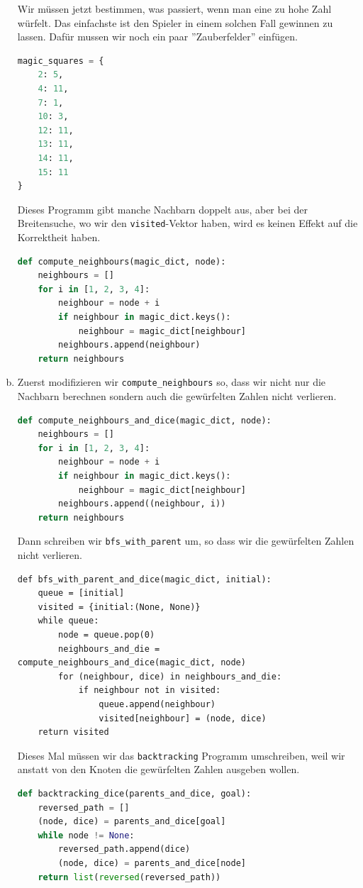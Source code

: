 \begin{enumerate}[(a)]
    Wir müssen jetzt bestimmen, was passiert, wenn man eine zu hohe Zahl würfelt. Das einfachste ist den Spieler in einem solchen Fall gewinnen zu lassen. Dafür mussen wir noch ein paar ''Zauberfelder'' einfügen.
    \begin{lstlisting}[language=Python]
magic_squares = {
    2: 5,
    4: 11,
    7: 1,
    10: 3,
    12: 11,
    13: 11,
    14: 11,
    15: 11
}
    \end{lstlisting}
    Dieses Programm gibt manche Nachbarn doppelt aus, aber bei der Breitensuche, wo wir den \texttt{visited}-Vektor haben, wird es keinen Effekt auf die Korrektheit haben.
    \begin{lstlisting}[language=Python]
def compute_neighbours(magic_dict, node):
    neighbours = []
    for i in [1, 2, 3, 4]:
        neighbour = node + i
        if neighbour in magic_dict.keys():
            neighbour = magic_dict[neighbour]
        neighbours.append(neighbour)
    return neighbours
    \end{lstlisting}{}
    
    \item Zuerst modifizieren wir \texttt{compute\_neighbours} so, dass wir nicht nur die Nachbarn berechnen sondern auch die gewürfelten Zahlen nicht verlieren.
    \begin{lstlisting}[language=Python]
def compute_neighbours_and_dice(magic_dict, node):
    neighbours = []
    for i in [1, 2, 3, 4]:
        neighbour = node + i
        if neighbour in magic_dict.keys():
            neighbour = magic_dict[neighbour]
        neighbours.append((neighbour, i))
    return neighbours
    \end{lstlisting}
    
    Dann schreiben wir \texttt{bfs\_with\_parent} um, so dass wir die gewürfelten Zahlen nicht verlieren.
    \begin{lstlisting}
def bfs_with_parent_and_dice(magic_dict, initial):
    queue = [initial]
    visited = {initial:(None, None)}
    while queue:
        node = queue.pop(0)
        neighbours_and_die = compute_neighbours_and_dice(magic_dict, node)
        for (neighbour, dice) in neighbours_and_die:
            if neighbour not in visited:
                queue.append(neighbour)
                visited[neighbour] = (node, dice)
    return visited
    \end{lstlisting}
    
    Dieses Mal müssen wir das \texttt{backtracking} Programm umschreiben, weil wir anstatt von den Knoten die gewürfelten Zahlen ausgeben wollen.
    \begin{lstlisting}[language=Python]
def backtracking_dice(parents_and_dice, goal):
    reversed_path = []
    (node, dice) = parents_and_dice[goal]
    while node != None:
        reversed_path.append(dice)
        (node, dice) = parents_and_dice[node]
    return list(reversed(reversed_path))
    \end{lstlisting}
    

\end{enumerate}
